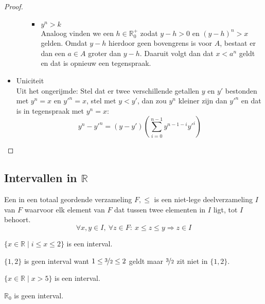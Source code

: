 \documentclass[main.tex]{subfiles}
\begin{document}
\begin{st}
\begin{proof}
\begin{itemize}
\begin{itemize}
\begin{itemize}
        \item $y^{n}>k$\\
          Analoog vinden we een $h\in \mathbb{R}_{0}^{+}$ zodat $y-h>0$ en $(y-h)^{n}>x$ gelden.
          Omdat $y-h$ hierdoor geen bovengrens is voor $A$\waarom, bestaat er dan een $a\in A$ groter dan $y-h$.
          Daaruit volgt dan dat $x<a^{n}$ geldt en dat is opnieuw een tegenspraak.
        \end{itemize}
      \end{itemize}
    \item Uniciteit\\
      Uit het ongerijmde:
      Stel dat er twee verschillende getallen $y$ en $y'$ bestonden met $y^{n}=x$ en $y'^{n}=x$, stel met $y<y'$, dan zou $y^{n}$ kleiner zijn dan $y'^{n}$ en dat is in tegenspraak met $y^{n}=x$:\waarom
      \[ y^{n}-y'^{n} = (y-y')\left( \sum^{n-1}_{i=0}y^{n-1-i}y'^{i}\right) \]
    \end{itemize}
  \end{proof}
\end{st}

\subsection{Intervallen in $\mathbb{R}$}
\label{sec:intervallen-in-R}

\begin{de}
  Een  in een totaal geordende verzameling $F,\le$ is een niet-lege deelverzameling $I$ van $F$ waarvoor elk element van $F$ dat tussen twee elementen in $I$ ligt, tot $I$ behoort.
  \[ \forall x,y \in I,\ \forall z\in F:\ x \le z \le y \Rightarrow z\in I \]
\end{de}

\begin{vb}
  $\{x\in \mathbb{R} \mid i \le x \le 2\}$ is een interval.
\end{vb}

\begin{vb}
  $\{1,2\}$ is geen interval want $1 \le \nicefrac{3}{2} \le 2$ geldt maar $\nicefrac{3}{2}$ zit niet in $\{1,2\}$.  
\end{vb}

\begin{vb}
  $\{x\in \mathbb{R} \mid x > 5\}$ is een interval.
\end{vb}

\begin{vb}
  $\mathbb{R}_{0}$ is geen interval.
\end{vb}
\end{document}

